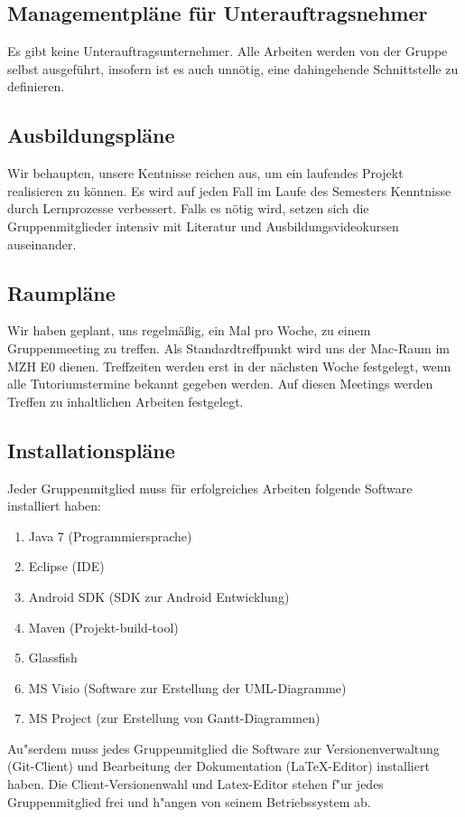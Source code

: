 \documentclass[fontsize=12pt,paper=a4,twoside]{scrartcl}
\begin{document}
\subsection{Managementpläne für Unterauftragsnehmer}
Es gibt keine Unterauftragsunternehmer. Alle Arbeiten werden von der Gruppe selbst ausgeführt, insofern ist es auch unnötig, eine dahingehende Schnittstelle zu definieren.

\subsection{Ausbildungspläne}
Wir behaupten, unsere Kentnisse reichen aus, um ein laufendes Projekt realisieren zu können. Es wird auf jeden Fall im Laufe des Semesters  Kenntnisse durch Lernprozesse verbessert. Falls es nötig wird, setzen sich die Gruppenmitglieder intensiv mit Literatur und Ausbildungsvideokursen auseinander.

\subsection{Raumpläne}
Wir haben geplant, uns regelmäßig, ein Mal pro Woche, zu einem Gruppenmeeting zu treffen. Als Standardtreffpunkt wird uns der Mac-Raum im MZH E0 dienen. Treffzeiten werden erst in der nächsten Woche festgelegt, wenn alle Tutoriumstermine bekannt gegeben werden. Auf diesen Meetings werden Treffen zu inhaltlichen Arbeiten festgelegt. 

\subsection{Installationspläne}

Jeder Gruppenmitglied muss für erfolgreiches Arbeiten folgende Software installiert haben:
\begin{enumerate}
 \item Java 7 (Programmiersprache)
 \item Eclipse (IDE)
 \item Android SDK (SDK zur Android Entwicklung)
 \item Maven (Projekt-build-tool)
 \item Glassfish 
 \item MS Visio (Software zur Erstellung der UML-Diagramme)
 \item MS Project (zur Erstellung von Gantt-Diagrammen)
\end{enumerate}
Au"serdem muss jedes Gruppenmitglied die Software zur Versionenverwaltung (Git-Client) und Bearbeitung der Dokumentation (LaTeX-Editor) installiert haben. Die Client-Versionenwahl und Latex-Editor stehen f"ur jedes Gruppenmitglied frei und h"angen von seinem Betriebssystem ab.
\end{document}
